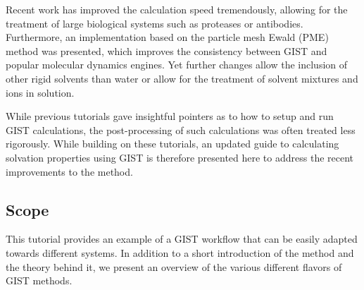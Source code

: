 \documentclass[9pt,tutorial]{livecoms}
\begin{document}
Recent work has improved the calculation speed tremendously, allowing for the treatment of large biological systems such as proteases or antibodies.
Furthermore, an implementation based on the particle mesh Ewald (PME) \cite{Darden1993-pme} method was presented, which improves the consistency between GIST and popular molecular dynamics engines. 
Yet further changes allow the inclusion of other rigid solvents than water or allow for the treatment of solvent mixtures and ions in solution.

While previous tutorials gave insightful pointers as to how to setup and run GIST calculations, the post-processing of such calculations was often treated less rigorously. While building on these tutorials, an updated guide to calculating solvation properties using GIST is therefore presented here to address the recent improvements to the method.

%
%
%

\subsection{Scope}

This tutorial provides an example of a GIST workflow that can be easily adapted towards different systems. 
In addition to a short introduction of the method and the theory behind it, we present an overview of the various different flavors of GIST methods.
\end{document}
